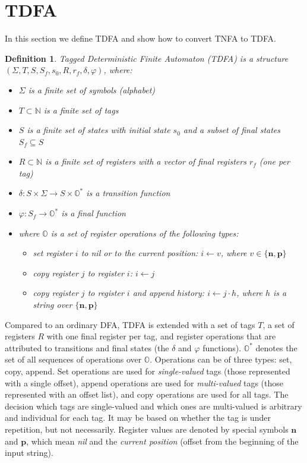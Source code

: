 \documentclass[]{article}
\newtheorem{definition}{Definition}
\newcommand{\YN}{\mathbb{N}}
\newcommand{\YO}{\mathbb{O}}
\begin{document}
\section{TDFA}\label{section_tdfa}

In this section we define TDFA and show how to convert TNFA to TDFA.

\begin{definition} \label{def_tnfa}
Tagged Deterministic Finite Automaton (TDFA)
is a structure $(\Sigma, T, S, S_f, s_0, R, r_{\!f}, \delta, \varphi)$, where:
\begin{itemize}
    \item[] $\Sigma$ is a finite set of symbols (alphabet)
    \item[] $T \subset \YN$ is a finite set of tags
    \item[] $S$ is a finite set of states with initial state $s_0$ and a subset of final states $S_f \subseteq S$
    \item[] $R \subset \YN$ is a finite set of registers with a vector of final registers $r_{\!f}$ (one per tag)
    \item[] $\delta : S \times \Sigma \rightarrow S \times \YO^*$ is a transition function
    \item[] $\varphi : S_f \rightarrow \YO^*$ is a final function
    \medskip
    \item[] where $\YO$ is a set of register operations of the following types:
    \begin{itemize}
        \item[] set register $i$ to nil or to the current position: $i \leftarrow v$, where $v \in \{\mathbf{n}, \mathbf{p}\}$
        \item[] copy register $j$ to register $i$: $i \leftarrow j$
        \item[] copy register $j$ to register $i$ and append history: $i \leftarrow j \cdot h$, where $h$ is a string over $\{\mathbf{n}, \mathbf{p}\}$
    \end{itemize}
\end{itemize}
\end{definition}

Compared to an ordinary DFA, TDFA is extended with a set of tags $T$,
a set of registers $R$ with one final register per tag,
and register operations that are attributed to transitions and final states (the $\delta$ and $\varphi$ functions).
$\YO^*$ denotes the set of all sequences of operations over $\YO$.
Operations can be of three types: set, copy, append.
Set operations are used for \emph{single-valued} tags (those represented with a single offset),
append operations are used for \emph{multi-valued} tags (those represented with an offset list), and
copy operations are used for all tags.
The decision which tags are single-valued and which ones are multi-valued is arbitrary and individual for each tag.
It may be based on whether the tag is under repetition, but not necessarily.
%
Register values are denoted by special symbols $\mathbf{n}$ and $\mathbf{p}$, which mean \emph{nil} and the \emph{current position} (offset from the beginning of the input string).
\\
\end{document}
